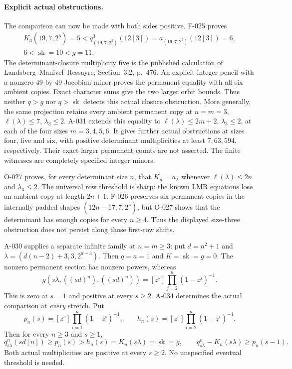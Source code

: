 \paragraph{Explicit actual obstructions.}
The comparison can now be made with both sides positive. F-025 proves
\[
 \begin{gathered}
 K_3(19,7,2^5)=5
 <q^3_{(19,7,2^5)}(12[3])=a_{(19,7,2^5)}(12[3])=6,\\
 6<\operatorname{sk}=10<g=11.
 \end{gathered}
\]
The determinant-closure multiplicity five is the published calculation
of Landsberg--Manivel--Ressayre, Section~3.2, p.~476. An explicit
integer pencil with a nonzero \(49\)-by-\(49\) Jacobian minor proves
the permanent equality with all six ambient copies. Exact character
sums give the two larger orbit bounds. Thus neither \(q>g\) nor
\(q>\operatorname{sk}\) detects this actual closure obstruction.
More generally, the same projection retains every ambient permanent
copy at \(n=m=3\), \(\ell(\lambda)\leq7\), \(\lambda_3\leq2\).
A-031 extends this equality to \(\ell(\lambda)\leq2m+2\),
\(\lambda_3\leq2\), at each of the four sizes \(m=3,4,5,6\).
It gives further actual obstructions at sizes four, five and six,
with positive determinant multiplicities at least \(7,63,594\),
respectively. Their exact larger permanent counts are not asserted.
The finite witnesses are completely specified integer minors.

O-027 proves, for every determinant size \(n\), that
\(K_n=a_\lambda\) whenever \(\ell(\lambda)\leq2n\) and
\(\lambda_3\leq2\). The universal row threshold is sharp:
the known LMR equations lose an ambient copy at length \(2n+1\).
F-026 preserves six permanent copies in the internally padded shapes
\((12n-17,7,2^5)\), but O-027 shows that the determinant has
enough copies for every \(n\geq4\). Thus the displayed size-three
obstruction does not persist along those first-row shifts.

A-030 supplies a separate infinite family at \(n=m\geq3\): put
\(d=n^2+1\) and
\(\lambda=(d(n-2)+3,3,2^{d-3})\). Then \(q=a=1\) and
\(K=\operatorname{sk}=g=0\). The nonzero permanent section has
nonzero powers, whereas
\[
 g(s\lambda,((sd)^n),((sd)^n))
             =[z^s]\prod_{j=2}^n(1-z^j)^{-1}.
\]
This is zero at \(s=1\) and positive at every \(s\geq2\).
A-034 determines the actual comparison at \emph{every} stretch.
Put
\[
 p_n(s)=[z^s]\prod_{i=1}^n(1-z^i)^{-1},\qquad
 h_n(s)=[z^s]\prod_{i=2}^n(1-z^i)^{-1}.
\]
Then for every \(n\geq3\) and \(s\geq1\),
\[
 q^n_{s\lambda}(sd[n])\geq p_n(s)>h_n(s)
                 =K_n(s\lambda)=\operatorname{sk}=g,
 \qquad q^n_{s\lambda}-K_n(s\lambda)\geq p_n(s-1).
\]
Both actual multiplicities are positive at every \(s\geq2\).
No unspecified eventual threshold is needed.

